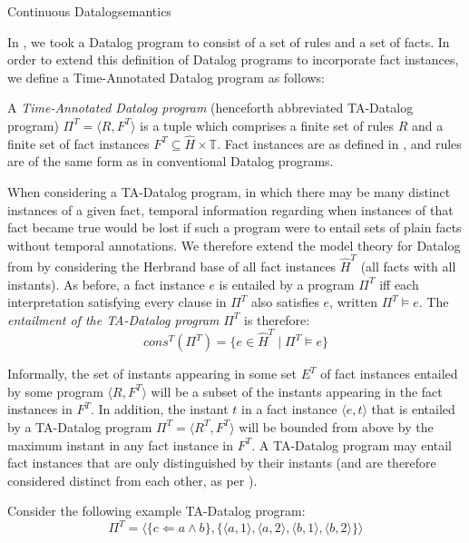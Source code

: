 \begin{nestedsection}{Continuous Datalog}{semantics}
\begin{definition}
\end{definition}

In , we took a Datalog
program to consist of a set of rules and a set of facts.  In order to
extend this definition of Datalog programs to incorporate fact
instances, we define a Time-Annotated Datalog program as follows:

\begin{definition}

A {\em Time-Annotated Datalog program} (henceforth abbreviated
TA-Datalog program) $\Pi^T = \langle R, F^T\rangle$ is a tuple which
comprises a finite set of rules $R$ and a finite set of fact instances
$F^T \subseteq \hat{H} \times \mathbb{T}$. Fact instances are as
defined in , and rules are
of the same form as in conventional Datalog programs.

When considering a TA-Datalog program, in which there may be many
distinct instances of a given fact, temporal information regarding
when instances of that fact became true would be lost if such a
program were to entail sets of plain facts without temporal
annotations. We therefore extend the model theory for Datalog from
 by considering the
Herbrand base of all fact instances $\hat{H}^T$ (all facts with all
instants). As before, a fact instance $e$ is entailed by a program
$\Pi^T$ iff each interpretation satisfying every clause in $\Pi^T$
also satisfies $e$, written $\Pi^T \models e$. The {\em entailment of the
TA-Datalog program} $\Pi^T$ is therefore:
\[ cons^T(\Pi^T) = \{ e \in \hat{H}^T \mid \Pi^T \models e \} \]

Informally, the set of instants appearing in some set $E^T$ of fact
instances entailed by some program ${\langle R, F^T \rangle}$ will be
a subset of the instants appearing in the fact instances in $F^T$.  In
addition, the instant $t$ in a fact instance $\langle e, t \rangle$
that is entailed by a TA-Datalog program $\Pi^T = \langle R^T, F^T
\rangle$ will be bounded from above by the maximum instant in any fact
instance in $F^T$. A TA-Datalog program may entail fact instances that
are only distinguished by their instants (and are therefore considered
distinct from each other, as per ).

Consider the following example TA-Datalog program:
\[
\Pi^T = \langle \{ c \Leftarrow a \land b \}, \{ \langle a, 1 \rangle, \langle a, 2 \rangle, \langle b, 1 \rangle, \langle b, 2 \rangle  \} \rangle
\]


\end{definition}
\end{nestedsection}
